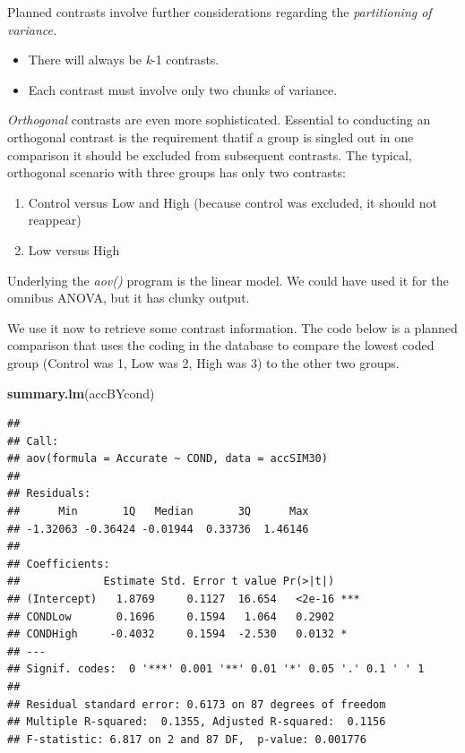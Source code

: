 \documentclass[
  english,
]{book}
\newenvironment{Shaded}{\begin{snugshade}}{\end{snugshade}}
\newcommand{\KeywordTok}[1]{\textcolor[rgb]{0.13,0.29,0.53}{\textbf{#1}}}
\newcommand{\NormalTok}[1]{#1}
\providecommand{\tightlist}{%
  \setlength{\itemsep}{0pt}\setlength{\parskip}{0pt}}
\begin{document}
Planned contrasts involve further considerations regarding the \emph{partitioning of variance.}

\begin{itemize}
\tightlist
\item
  There will always be \emph{k}-1 contrasts.
\item
  Each contrast must involve only two chunks of variance.
\end{itemize}

\emph{Orthogonal} contrasts are even more sophisticated. Essential to conducting an orthogonal contrast is the requirement thatif a group is singled out in one comparison it should be excluded from subsequent contrasts. The typical, orthogonal scenario with three groups has only two contrasts:

\begin{enumerate}
\def\labelenumi{\arabic{enumi}.}
\tightlist
\item
  Control versus Low and High (because control was excluded, it should not reappear)
\item
  Low versus High
\end{enumerate}

Underlying the \emph{aov()} program is the linear model. We could have used it for the omnibus ANOVA, but it has clunky output.

We use it now to retrieve some contrast information. The code below is a planned comparison that uses the coding in the database to compare the lowest coded group (Control was 1, Low was 2, High was 3) to the other two groups.

\begin{Shaded}
\begin{Highlighting}[]
\KeywordTok{summary.lm}\NormalTok{(accBYcond)}
\end{Highlighting}
\end{Shaded}

\begin{verbatim}
## 
## Call:
## aov(formula = Accurate ~ COND, data = accSIM30)
## 
## Residuals:
##      Min       1Q   Median       3Q      Max 
## -1.32063 -0.36424 -0.01944  0.33736  1.46146 
## 
## Coefficients:
##             Estimate Std. Error t value Pr(>|t|)    
## (Intercept)   1.8769     0.1127  16.654   <2e-16 ***
## CONDLow       0.1696     0.1594   1.064   0.2902    
## CONDHigh     -0.4032     0.1594  -2.530   0.0132 *  
## ---
## Signif. codes:  0 '***' 0.001 '**' 0.01 '*' 0.05 '.' 0.1 ' ' 1
## 
## Residual standard error: 0.6173 on 87 degrees of freedom
## Multiple R-squared:  0.1355, Adjusted R-squared:  0.1156 
## F-statistic: 6.817 on 2 and 87 DF,  p-value: 0.001776
\end{verbatim}
\end{document}
